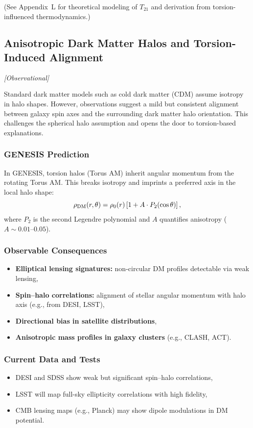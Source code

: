 \documentclass{article}
\newcommand{\obstag}{\textcolor{green!60!black}{\textit{[Observational]}}}
\begin{document}
(See Appendix~L for theoretical modeling of $T_{21}$ and derivation from torsion-influenced thermodynamics.)


\subsection{ Anisotropic Dark Matter Halos and Torsion-Induced Alignment}
\label{sec:dm_anisotropy}
\obstag

Standard dark matter models such as cold dark matter (CDM) assume isotropy in halo shapes. However, observations suggest a mild but consistent alignment between galaxy spin axes and the surrounding dark matter halo orientation. This challenges the spherical halo assumption and opens the door to torsion-based explanations.

\subsubsection*{GENESIS Prediction}
In GENESIS, torsion halos (Torus AM) inherit angular momentum from the rotating Torus AM. This breaks isotropy and imprints a preferred axis in the local halo shape:
\begin{equation}
\rho_{\rm DM}(r, \theta) = \rho_0(r) \left[1 + A \cdot P_2(\cos\theta)\right],
\end{equation}
where $P_2$ is the second Legendre polynomial and $A$ quantifies anisotropy ($A \sim 0.01$–$0.05$).

\subsubsection*{Observable Consequences}
\begin{itemize}
  \item \textbf{Elliptical lensing signatures:} non-circular DM profiles detectable via weak lensing,
  \item \textbf{Spin–halo correlations:} alignment of stellar angular momentum with halo axis (e.g., from DESI, LSST),
  \item \textbf{Directional bias in satellite distributions},
  \item \textbf{Anisotropic mass profiles in galaxy clusters} (e.g., CLASH, ACT).
\end{itemize}

\subsubsection*{Current Data and Tests}
\begin{itemize}
  \item DESI and SDSS show weak but significant spin–halo correlations,
  \item LSST will map full-sky ellipticity correlations with high fidelity,
  \item CMB lensing maps (e.g., Planck) may show dipole modulations in DM potential.
\end{itemize}
\end{document}
